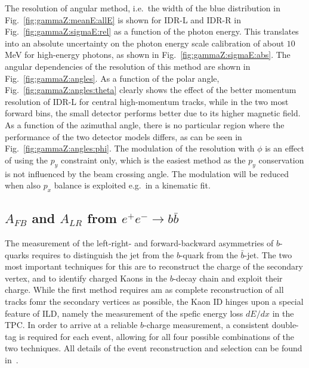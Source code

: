 The resolution of angular method, i.e.\ the width of the blue distribution in Fig.~\ref{fig:gammaZ:meanE:allE} is shown for IDR-L and IDR-R in Fig.~\ref{fig:gammaZ:sigmaE:rel} as a function of the photon energy. This translates into
an absolute uncertainty on the photon energy scale calibration of about $10$\,MeV for high-energy photons, as shown in Fig.~\ref{fig:gammaZ:sigmaE:abs}. 
The angular dependencies of the resolution of this method are shown in Fig.~\ref{fig:gammaZ:angles}. As a function of the polar angle, Fig.~\ref{fig:gammaZ:angles:theta} clearly shows the effect of the better momentum resolution of IDR-L for central high-momentum tracks, while in the two most forward bins, the small detector performs better due to its higher magnetic field. As a function of the azimuthal angle, there is no particular region where the performance of the two detector models differs, as can be seen in Fig.~\ref{fig:gammaZ:angles:phi}. The modulation of the resolution with $\phi$ is an effect of using the $p_y$ constraint only, which is the easiest method as the $p_y$ conservation is not influenced by the beam crossing angle. The modulation will be reduced when also $p_x$ balance is exploited e.g.\ in a kinematic fit.

\subsection{\texorpdfstring{$A_{FB}$ and $A_{LR}$ from $e^+e^- \to b\bar{b}$}{AFB and ALR from ee -> bb}}
\label{subsec:bench:bbbar}

The measurement of the left-right- and forward-backward asymmetries of $b$-quarks requires to distinguish the jet from the $b$-quark from the $\bar{b}$-jet. The two most important techniques for this are to reconstruct the charge of the secondary vertex, and to identify charged Kaons in the $b$-decay chain and exploit their charge. While the first method requires am as complete reconstruction of all tracks fomr the secondary vertices as possible, the Kaon ID hinges upon a special
feature of ILD, namely the measurement of the spefic energy loss $dE/dx$ in the TPC. In order to arrive at a reliable $b$-charge measurement, a consistent double-tag is required for each event, allowing for all four  possible combinations of the two techniques. All details of the event reconstruction and selection can be found in~\cite{ILDNote:bbtt}.

